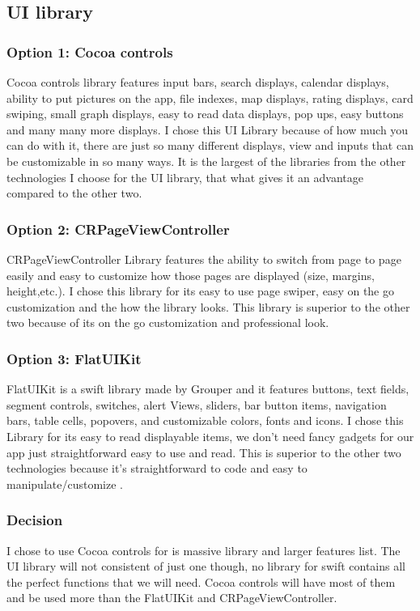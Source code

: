 \documentclass[onecolumn, draftclsnofoot,10pt, compsoc]{IEEEtran}
\begin{document}
\subsection{UI library}
\subsubsection{Option 1: Cocoa controls}
Cocoa controls library features input bars, search displays, calendar displays, ability to put pictures on the app, file indexes, map displays, rating displays, card swiping, small graph displays, easy to read data displays, pop ups, easy buttons and many many more displays. \cite{Cocoa}
I chose this UI Library because of how much you can do with it, there are just so many different displays, view and inputs that can be customizable in so many ways.
It is the largest of the libraries from the other technologies I choose for the UI library, that what gives it an advantage compared to the other two.
\subsubsection{Option 2: CRPageViewController}
CRPageViewController Library features the ability to switch from page to page easily and easy to customize how those pages are displayed (size, margins, height,etc.).\cite{Github1}
 I chose this library for its easy to use page swiper, easy on the go customization and the how the library looks.
This library is superior to the other two because of its on the go customization and professional look.
\subsubsection{Option 3: FlatUIKit}
FlatUIKit is a swift library made by Grouper and it features buttons, text fields, segment controls, switches, alert Views, sliders, bar button items, navigation bars, table cells, popovers, and customizable colors, fonts and icons.\cite{Github2}
 I chose this Library for its easy to read displayable items, we don't need fancy gadgets for our app just straightforward easy to use and read.
 This is superior to the other two technologies because it's straightforward to code and easy to manipulate/customize .
\subsubsection{Decision}
I chose to use Cocoa controls for is massive library and larger features list.
The UI library will not consistent of just one though, no library for swift contains all the perfect functions that we will need.
Cocoa controls will have most of them and be used more than the FlatUIKit and CRPageViewController.
\end{document}
